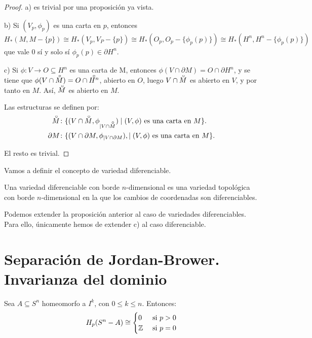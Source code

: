 \begin{proof}
  a) es trivial por una proposición ya vista.

  b) Si $(V_p, \phi_p)$ es una carta en $p$, entonces
  \[ H_*(M, M - \{p\}) \cong H_*(V_p, V_P - \{p\}) \cong H_*(O_p, O_p - \{\phi_p(p)\}) \cong H_*(H^n, H^n - \{\phi_p(p)\}) \]
  que vale $0$ sí y solo sí $\phi_p(p) \in \partial H^n$.

  c) Si $\phi \colon V \to O \subseteq H^n$ es una carta de M, entonces $\phi(V \cap \partial M) = O \cap \partial H^n$, y se tiene que
  $\phi(V \cap \interior{M}) = O \cap \interior{H^n}$, abierto en $O$, luego $V \cap \interior{M}$ es abierto en $V$, y por tanto en $M$.
  Así, $\interior{M}$ es abierto en $M$.

  Las estructuras se definen por:
  \begin{align*}
    \interior{M} &\colon \{(V \cap \interior{M}, \phi_{|V \cap \interior{M}}) \mid (V, \phi) \text{ es una carta en }M\}. \\
    \partial M &\colon   \{(V \cap \partial M,  \phi_{|V \cap \partial M}), \mid (V, \phi) \text{ es una carta en }M\}.
  \end{align*}

  El resto es trivial.
\end{proof}

Vamos a definir el concepto de variedad diferenciable.

\begin{definition}
  Una variedad diferenciable con borde $n$-dimensional es una variedad topológica con borde $n$-dimensional en la que
  los cambios de coordenadas son diferenciables.
\end{definition}

\begin{remark}
  Podemos extender la proposición anterior al caso de variedades diferenciables. Para ello, únicamente hemos de extender
  c) al caso diferenciable.
\end{remark}

\section{Separación de Jordan-Brower. Invarianza del dominio}

\begin{proposition}
  Sea $A \subseteq S^n$ homeomorfo a $I^k$, con $0 \leq k \leq n$. Entonces:
  \[ H_p(S^n - A) \cong \begin{cases} 0 &\text{ si } p > 0 \\ \mathbb{Z} &\text{ si } p = 0 \end{cases} \]
\end{proposition}

